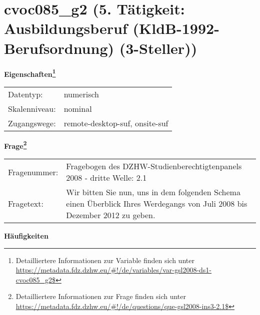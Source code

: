 
    \setcounter{footnote}{0}

    \vspace*{-1.8cm}
	\section{cvoc085\_g2 (5. Tätigkeit: Ausbildungsberuf (KldB-1992-Berufsordnung) (3-Steller))}
	\label{section:cvoc085_g2}



    \vspace*{0.5cm}
    \noindent\textbf{Eigenschaften\footnote{Detailliertere Informationen zur Variable finden sich unter
		\url{https://metadata.fdz.dzhw.eu/\#!/de/variables/var-gsl2008-ds1-cvoc085_g2$}}}\\
	\begin{tabularx}{\hsize}{@{}lX}
	Datentyp: & numerisch \\
	Skalenniveau: & nominal \\
	Zugangswege: &
	  remote-desktop-suf, 
	  onsite-suf
 \\
    \end{tabularx}



				\vspace*{0.5cm}
                \noindent\textbf{Frage\footnote{Detailliertere Informationen zur Frage finden sich unter
		              \url{https://metadata.fdz.dzhw.eu/\#!/de/questions/que-gsl2008-ins3-2.1$}}}\\
				\begin{tabularx}{\hsize}{@{}lX}
					Fragenummer: &
					  Fragebogen des DZHW-Studienberechtigtenpanels 2008 - dritte Welle:
					  2.1
 \\
					Fragetext: & Wir bitten Sie nun, uns in dem folgenden Schema einen Überblick Ihres Werdegangs von Juli 2008 bis Dezember 2012 zu geben. \\
				\end{tabularx}





        		\vspace*{0.5cm}
                \noindent\textbf{Häufigkeiten}


